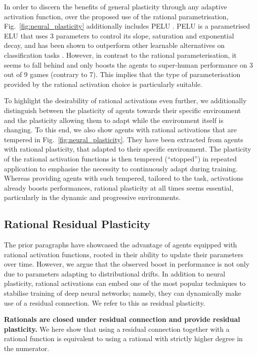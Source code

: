 \documentclass[accepted]{article}
\theoremstyle{plain}
\theoremstyle{definition}
\theoremstyle{remark}
\begin{document}
In order to discern the benefits of general plasticity through any adaptive activation function, over the proposed use of the rational parametrisation, Fig.~\ref{fig:neural_plasticity} additionally includes PELU \citep{TrottierGC17}. PELU is a parametrised ELU that uses 3 parameters to control its slope, saturation and exponential decay, and has been shown to outperform other learnable alternatives on classification tasks \citep{Godfrey2019AnEO}. However, in contrast to the rational parameterisation, it seems to fall behind and only boosts the agents to super-human performance on 3 out of 9 games (contrary to 7). This implies that the type of parameterisation provided by the rational activation choice is particularly suitable.

To highlight the desirability of rational activations even further, we additionally distinguish between the plasticity of agents towards their specific environment and the plasticity allowing them to adapt while the environment itself is changing. To this end, we also show agents with rational activations that are tempered in Fig.~\ref{fig:neural_plasticity}. They have been extracted from agents with rational plasticity, that adapted to their specific environment. The plasticity of the rational activation functions is then tempered (``stopped'') in repeated application to emphasise the necessity to continuously adapt during training. Whereas providing agents with such tempered, tailored to the task, activations already boosts performances, rational plasticity at all times seems essential, particularly in the dynamic and progressive environments.

\subsection{Rational Residual Plasticity}
The prior paragraphs have showcased the advantage of agents equipped with rational activation functions, rooted in their ability to update their parameters over time. However, we argue that the observed boost in performance is not only due to parameters adapting to distributional drifts. In addition to neural plasticity, rational activations can embed one of the most popular techniques to stabilise training of deep neural networks; namely, they can dynamically make use of a residual connection. We refer to this as residual plasticity. 

\textbf{Rationals are closed under residual connection and provide residual plasticity.}
We here show that using a residual connection together with a rational function is equivalent to using a rational with strictly higher degree in the numerator.
\end{document}

